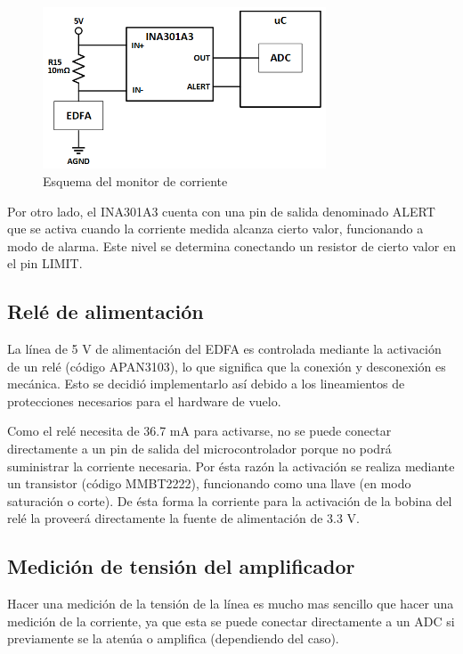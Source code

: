 \begin{figure}[H]
\centering
\includegraphics[width=0.75\textwidth]{./Figures/func_monitor.png}
\caption{Esquema del monitor de corriente}
\label{fig:funcMonitor}
\end{figure}

Por otro lado, el INA301A3 cuenta con una pin de salida denominado ALERT que se activa cuando la corriente medida alcanza cierto valor, funcionando a modo de alarma. Este nivel se determina conectando un resistor de cierto valor en el pin LIMIT.

\subsection{Relé de alimentación}

La línea de 5 V de alimentación del EDFA es controlada mediante la activación de un relé (código APAN3103), lo que significa que la conexión y desconexión es mecánica. Esto se decidió implementarlo así debido a los lineamientos de protecciones necesarios para el hardware de vuelo.

Como el relé necesita de 36.7 mA para activarse, no se puede conectar directamente a un pin de salida del microcontrolador porque no podrá suministrar la corriente necesaria. Por ésta razón la activación se realiza mediante un transistor (código MMBT2222), funcionando como una llave (en modo saturación o corte). De ésta forma la corriente para la activación de la bobina del relé la proveerá directamente la fuente de alimentación de 3.3 V.

\subsection{Medición de tensión del amplificador}

Hacer una medición de la tensión de la línea es mucho mas sencillo que hacer una medición de la corriente, ya que esta se puede conectar directamente a un ADC si previamente se la atenúa o amplifica (dependiendo del caso).

